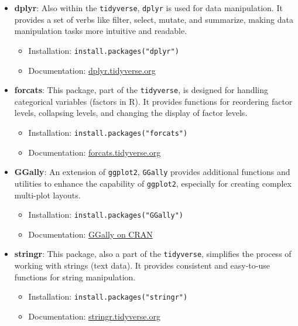 \documentclass[11pt]{article}\usepackage[]{graphicx}\usepackage[]{xcolor}
\begin{document}
\begin{itemize}
    \item \textbf{dplyr}: Also within the \texttt{tidyverse}, \texttt{dplyr} is used for data manipulation. It provides a set of verbs like filter, select, mutate, and summarize, making data manipulation tasks more intuitive and readable.
    \begin{itemize}
        \item Installation: \texttt{install.packages("dplyr")}
        \item Documentation: \href{https://dplyr.tidyverse.org/}{dplyr.tidyverse.org}
    \end{itemize}
    
    \item \textbf{forcats}: This package, part of the \texttt{tidyverse}, is designed for handling categorical variables (factors in R). It provides functions for reordering factor levels, collapsing levels, and changing the display of factor levels.
    \begin{itemize}
        \item Installation: \texttt{install.packages("forcats")}
        \item Documentation: \href{https://forcats.tidyverse.org/}{forcats.tidyverse.org}
    \end{itemize}
    
    \item \textbf{GGally}: An extension of \texttt{ggplot2}, \texttt{GGally} provides additional functions and utilities to enhance the capability of \texttt{ggplot2}, especially for creating complex multi-plot layouts.
    \begin{itemize}
        \item Installation: \texttt{install.packages("GGally")}
        \item Documentation: \href{https://cran.r-project.org/web/packages/GGally/index.html}{GGally on CRAN}
    \end{itemize}
    
    \item \textbf{stringr}: This package, also a part of the \texttt{tidyverse}, simplifies the process of working with strings (text data). It provides consistent and easy-to-use functions for string manipulation.
    \begin{itemize}
        \item Installation: \texttt{install.packages("stringr")}
        \item Documentation: \href{https://stringr.tidyverse.org/}{stringr.tidyverse.org}
    \end{itemize}
\end{itemize}
\end{document}
